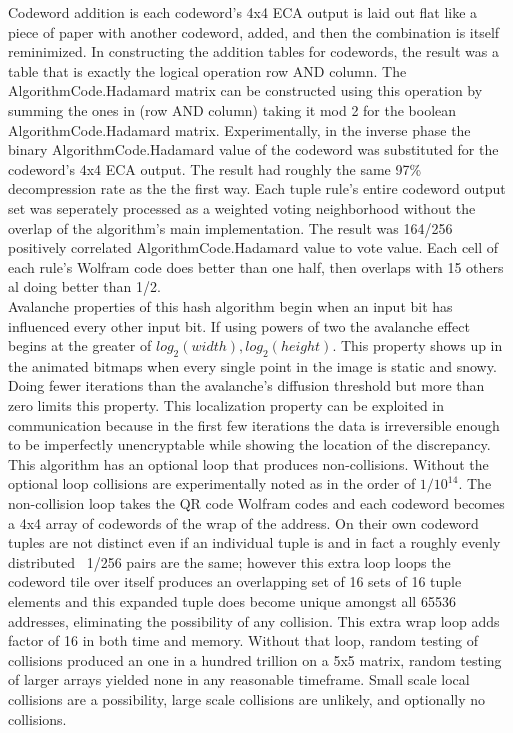 \documentclass[11pt]{article}
\begin{document}
Codeword addition is each codeword's 4x4 ECA output is laid out flat like a piece of paper with another codeword, added, and then the combination is itself reminimized. In constructing the addition tables for codewords, the result was a table that is exactly the logical operation row AND column. The AlgorithmCode.Hadamard matrix can be constructed using this operation by summing the ones in (row AND column) taking it mod 2 for the boolean AlgorithmCode.Hadamard matrix. Experimentally, in the inverse phase the binary AlgorithmCode.Hadamard value of the codeword was substituted for the codeword's 4x4 ECA output. The result had roughly the same 97\% decompression rate as the the first way. Each tuple rule's entire codeword output set was seperately processed as a weighted voting neighborhood without the overlap of the algorithm's main implementation. The result was 164/256 positively correlated AlgorithmCode.Hadamard value to vote value. Each cell of each rule's Wolfram code does better than one half, then overlaps with 15 others al doing better than 1/2.\\

Avalanche properties of this hash algorithm begin when an input bit has influenced every other input bit. If using powers of two the avalanche effect begins at the greater of $log_2 (width) , log_2 (height)$. This property shows up in the animated bitmaps when every single point in the image is static and snowy. Doing fewer iterations than the avalanche's diffusion threshold but more than zero limits this property. This localization property can be exploited in communication because in the first few iterations the data is irreversible enough to be imperfectly unencryptable while showing the location of the discrepancy.\\

This algorithm has an optional loop that produces non-collisions. Without the optional loop collisions are experimentally noted as in the order of $1/10^14$. The non-collision loop takes the QR code Wolfram codes and each codeword becomes a 4x4 array of codewords of the wrap of the address. On their own codeword tuples are not distinct even if an individual tuple is and in fact a roughly evenly distributed ~1/256 pairs are the same; however this extra loop loops the codeword tile over itself produces an overlapping set of 16 sets of 16 tuple elements and this expanded tuple does become unique amongst all 65536 addresses, eliminating the possibility of any collision. This extra wrap loop adds factor of 16 in both time and memory. Without that loop, random testing of collisions produced an one in a hundred trillion on a 5x5 matrix, random testing of larger arrays yielded none in any reasonable timeframe. Small scale local collisions are a possibility, large scale collisions are unlikely, and optionally no collisions.\\
\end{document}
